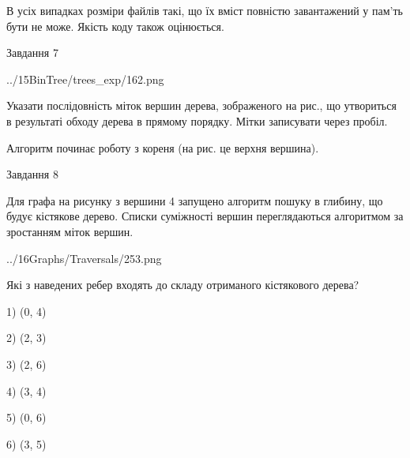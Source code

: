 \documentclass[12pt, ukrainian]{article}
\begin{document}
{В усіх випадках розміри файлів такі, що їх вміст повністю завантажений у пам'ть бути не може. Якість коду також оцінюється.



\vspace{10mm}\par

\newpage
\begin{minipage}[t]{9.7cm}
               
{\begin{center}Завдання {7}\end{center}}
\vspace{-4mm}

\begin{center}
	{../15BinTree/trees_exp/162.png}
\end{center}
Указати послідовність міток вершин дерева, зображеного на рис., що утвориться в результаті обходу дерева в прямому порядку. Мітки записувати через пробіл.\par Алгоритм починає роботу з кореня (на рис. це верхня вершина).\par

\end{minipage}
\vline \hspace{8mm}
\begin{minipage}[t]{8.0cm}
               
{\begin{center}Завдання {8}\end{center}}
\vspace{-4mm}
Для графа на рисунку з вершини 4 запущено алгоритм пошуку в глибину, що будує кістякове дерево. Списки суміжності вершин переглядаються алгоритмом за зростанням міток вершин.\par
\begin{center}
	{../16Graphs/Traversals/253.png}
\end{center}
\par Які з наведених ребер входять до складу отриманого кістякового дерева?\par
1) (0, 4)\par
2) (2, 3)\par
3) (2, 6)\par
4) (3, 4)\par
5) (0, 6)\par
6) (3, 5)\par
{\vskip 15pt} \par


\end{minipage}}
\end{document}
